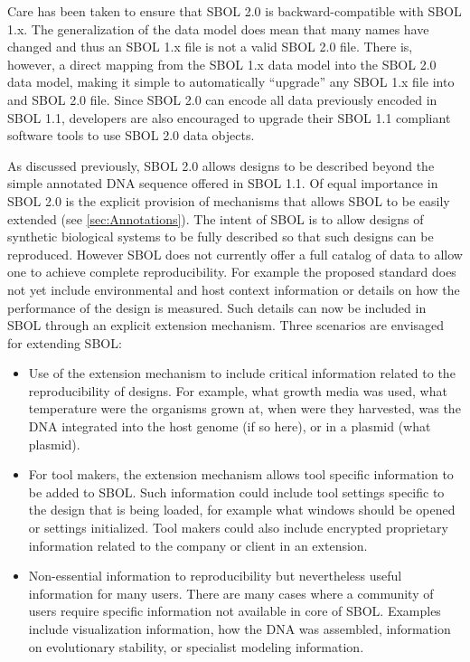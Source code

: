 Care has been taken to ensure that SBOL 2.0 is backward-compatible with SBOL 1.x.  
The generalization of the data model does mean that many names have changed and thus an SBOL 1.x file is not a valid SBOL 2.0 file.
There is, however, a direct mapping from the SBOL 1.x data model into the SBOL 2.0 data model, making it simple to automatically ``upgrade'' any SBOL 1.x file into and SBOL 2.0 file.
Since SBOL 2.0 can encode all data previously encoded in SBOL 1.1, developers are also encouraged to upgrade their SBOL 1.1 compliant software tools to use SBOL 2.0 data objects. 

As discussed previously, SBOL 2.0 allows designs to be described beyond the simple annotated DNA sequence offered in SBOL 1.1. Of equal importance in SBOL 2.0 is the explicit provision of mechanisms that allows SBOL to be easily extended (see \ref{sec:Annotations}). The intent of SBOL is to allow designs of synthetic biological systems to be fully described so that such designs can be reproduced. However SBOL does not currently offer a full catalog of data %
to allow one to achieve complete reproducibility. For example the proposed standard does not yet include environmental and host context information or details on how the performance of the design is measured. Such details can now be included in SBOL through an explicit extension mechanism. Three scenarios are envisaged for extending SBOL:

\begin{itemize}
\item Use of the extension mechanism to include critical information related to the reproducibility of designs. For example, what growth media was used, what temperature were the organisms grown at, when were they harvested, was the DNA integrated into the host genome (if so here), or in a plasmid (what plasmid).
\item For tool makers, the extension mechanism allows tool specific information to be added to SBOL. Such information could include tool settings specific to the design that is being loaded, for example what windows should be opened or settings initialized. Tool makers could also include encrypted proprietary information related to the company or client in an extension. 
\item Non-essential information to reproducibility but nevertheless useful information for many users. There are many cases where a community of users require specific information not available in core of SBOL. Examples include visualization information, how the DNA was assembled, information on evolutionary stability, or specialist modeling information.
\end{itemize}

